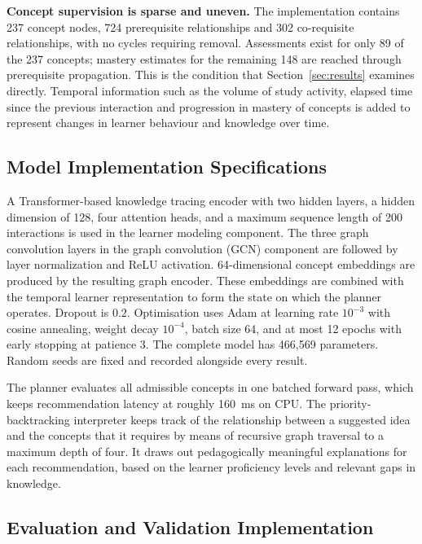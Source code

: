 \textbf{Concept supervision is sparse and uneven.} The implementation contains 237 concept
nodes, 724 prerequisite relationships and 302 co-requisite relationships, with no cycles
requiring removal. Assessments exist for only 89 of the 237 concepts; mastery estimates
for the remaining 148 are reached through prerequisite propagation. This is the condition
that Section~\ref{sec:results} examines directly. Temporal information such as the volume
of study activity, elapsed time since the previous interaction and progression in mastery
of concepts is added to represent changes in learner behaviour and knowledge over time.

\subsection{Model Implementation Specifications}

A Transformer-based knowledge tracing encoder with two hidden layers, a hidden dimension
of 128, four attention heads, and a maximum sequence length of 200 interactions is used in
the learner modeling component. The three graph convolution layers in the graph
convolution (GCN) component are followed by layer normalization and ReLU activation.
64-dimensional concept embeddings are produced by the resulting graph encoder. These
embeddings are combined with the temporal learner representation to form the state on
which the planner operates. Dropout is $0.2$. Optimisation uses Adam at learning rate
$10^{-3}$ with cosine annealing, weight decay $10^{-4}$, batch size 64, and at most 12
epochs with early stopping at patience 3. The complete model has 466{,}569 parameters.
Random seeds are fixed and recorded alongside every result.

The planner evaluates all admissible concepts in one batched forward pass, which keeps
recommendation latency at roughly 160~ms on CPU. The priority-backtracking interpreter keeps track of the
relationship between a suggested idea and the concepts that it requires by means of
recursive graph traversal to a maximum depth of four. It draws out pedagogically
meaningful explanations for each recommendation, based on the learner proficiency levels
and relevant gaps in knowledge.

\subsection{Evaluation and Validation Implementation}

